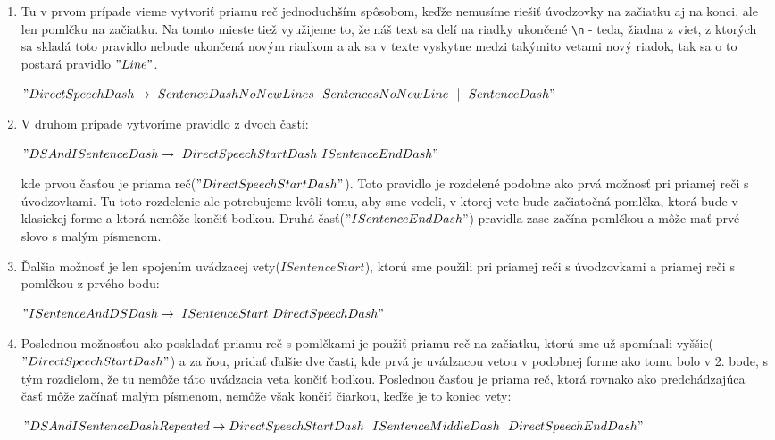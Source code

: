 \documentclass[12pt,a4paper]{report}
\theoremstyle{definition}
\theoremstyle{remark}
\begin{document}
\begin{enumerate}[leftmargin=*]
\item Tu v prvom prípade vieme vytvoriť priamu reč jednoduchším spôsobom, keďže nemusíme riešiť úvodzovky na začiatku aj na konci, ale len pomlčku na začiatku. Na tomto mieste tiež využijeme to, že náš text sa delí na riadky ukončené \verb!\n! - teda, žiadna z viet, z ktorých sa skladá toto pravidlo nebude ukončená novým riadkom a ak sa v texte vyskytne medzi takýmito vetami nový riadok, tak sa o to postará pravidlo $"Line"$.

$"DirectSpeechDash \\ \to \ SentenceDashNoNewLines \ \ SentencesNoNewLine \ \ |  \ \ SentenceDash"$
\item V druhom prípade vytvoríme pravidlo z dvoch častí:

$"DSAndISentenceDash \to \ DirectSpeechStartDash \ ISentenceEndDash"$ 


kde prvou časťou je priama reč($"DirectSpeechStartDash"$). Toto pravidlo je rozdelené podobne ako prvá možnosť pri priamej reči s úvodzovkami. Tu toto rozdelenie ale potrebujeme kvôli tomu, aby sme vedeli, v ktorej vete bude začiatočná pomlčka, ktorá bude v klasickej forme a ktorá nemôže končiť bodkou. Druhá časť($"ISentenceEndDash"$) pravidla zase začína pomlčkou a môže mať prvé slovo s malým písmenom.
\item Ďalšia možnosť je len spojením uvádzacej vety($ISentenceStart$), ktorú sme použili pri priamej reči s úvodzovkami a priamej reči s pomlčkou z prvého bodu:


$"ISentenceAndDSDash \to \ ISentenceStart \ DirectSpeechDash"$
\item Poslednou možnosťou ako poskladať priamu reč s pomlčkami je použiť priamu reč na začiatku, ktorú sme už spomínali vyššie($"DirectSpeechStartDash"$) a za ňou, pridať ďalšie dve časti, kde prvá je uvádzacou vetou v podobnej forme ako tomu bolo v 2. bode, s tým rozdielom, že tu nemôže táto uvádzacia veta končiť bodkou. Poslednou časťou je priama reč, ktorá rovnako ako predchádzajúca časť môže začínať malým písmenom, nemôže však končiť čiarkou, keďže je to koniec vety:


$"DSAndISentenceDashRepeated \to 
\\ DirectSpeechStartDash \ \ ISentenceMiddleDash\ \ DirectSpeechEndDash"$


%
%
\end{enumerate} 
\end{document}
